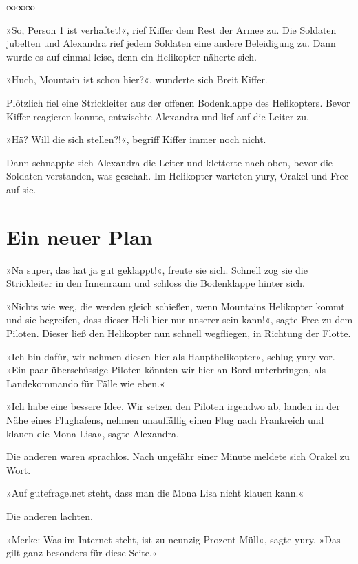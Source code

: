 \begin{center}
    ∞∞∞
\end{center}

»So, Person 1 ist verhaftet!«, rief Kiffer dem Rest der Armee zu. Die Soldaten jubelten und Alexandra rief jedem Soldaten eine andere Beleidigung zu. Dann wurde es auf einmal leise, denn ein Helikopter näherte sich.

»Huch, Mountain ist schon hier?«, wunderte sich Breit Kiffer.

Plötzlich fiel eine Strickleiter aus der offenen Bodenklappe des Helikopters. Bevor Kiffer reagieren konnte, entwischte Alexandra und lief auf die Leiter zu.

»Hä? Will die sich stellen?!«, begriff Kiffer immer noch nicht.

Dann schnappte sich Alexandra die Leiter und kletterte nach oben, bevor die Soldaten verstanden, was geschah. Im Helikopter warteten yury, Orakel und Free auf sie.


\chapter{Ein neuer Plan}

»Na super, das hat ja gut geklappt!«, freute sie sich. Schnell zog sie die Strickleiter in den Innenraum und schloss die Bodenklappe hinter sich.

»Nichts wie weg, die werden gleich schießen, wenn Mountains Helikopter kommt und sie begreifen, dass dieser Heli hier nur unserer sein kann!«, sagte Free zu dem Piloten. Dieser ließ den Helikopter nun schnell wegfliegen, in Richtung der Flotte.

»Ich bin dafür, wir nehmen diesen hier als Haupthelikopter«, schlug yury vor. »Ein paar überschüssige Piloten könnten wir hier an Bord unterbringen, als Landekommando für Fälle wie eben.«

»Ich habe eine bessere Idee. Wir setzen den Piloten irgendwo ab, landen in der Nähe eines Flughafens, nehmen unauffällig einen Flug nach Frankreich und klauen die Mona Lisa«, sagte Alexandra.

Die anderen waren sprachlos. Nach ungefähr einer Minute meldete sich Orakel zu Wort.

»Auf gutefrage.net steht, dass man die Mona Lisa nicht klauen kann.«

Die anderen lachten.

»Merke: Was im Internet steht, ist zu neunzig Prozent Müll«, sagte yury. »Das gilt ganz besonders für diese Seite.«

